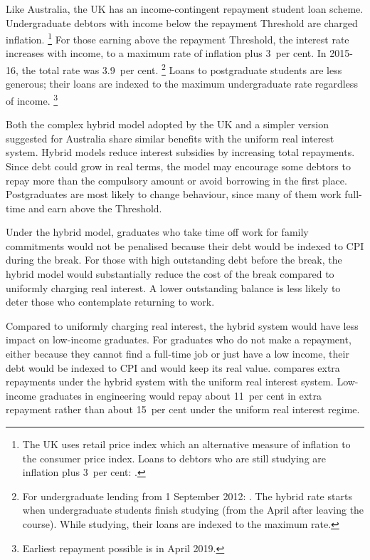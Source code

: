 \documentclass[embargoed]{grattan}
\begin{document}
Like Australia, the UK has an income-contingent repayment student loan scheme.
Undergraduate debtors with income below the repayment \gls{Threshold} are charged inflation.%
\footnote{The UK uses retail price index which an alternative measure of inflation to the consumer price index.
Loans to debtors who are still studying are inflation plus 3~per cent: \textcite{Company2015Studentloanrepayment}.} For those earning above the repayment \gls{Threshold}, the interest rate increases with income, to a maximum rate of inflation plus 3~per cent.
In 2015-16, the total rate was 3.9~per cent.%
\footnote{For undergraduate lending from 1 September 2012: \textcite{Company2015Studentloanrepayment}.
The hybrid rate starts when undergraduate students finish studying (from the April after leaving the course).
While studying, their loans are indexed to the maximum rate.} Loans to postgraduate students are less generous; their loans are indexed to the maximum undergraduate rate regardless of income.%
\footnote{Earliest repayment possible is in April 2019.}

Both the complex hybrid model adopted by the UK and a simpler version suggested for Australia share similar benefits with the uniform real interest system.
Hybrid models reduce interest subsidies by increasing total repayments.
Since debt could grow in real terms, the model may encourage some debtors to repay more than the compulsory amount or avoid borrowing in the first place.
Postgraduates are most likely to change behaviour, since many of them work full-time and earn above the \gls{Threshold}.

Under the hybrid model, graduates who take time off work for family commitments would not be penalised because their debt would be indexed to \gls{CPI} during the break.
For those with high outstanding debt before the break, the hybrid model would substantially reduce the cost of the break compared to uniformly charging real interest.
A lower outstanding balance is less likely to deter those who contemplate returning to work.

Compared to uniformly charging real interest, the hybrid system would have less impact on low-income graduates.
For graduates who do not make a repayment, either because they cannot find a full-time job or just have a low income, their debt would be indexed to \gls{CPI} and would keep its real value.
 compares extra repayments under the hybrid system with the uniform real interest system.
Low-income graduates in engineering would repay about 11~per cent in extra repayment rather than about 15~per cent under the uniform real interest regime.
\end{document}
